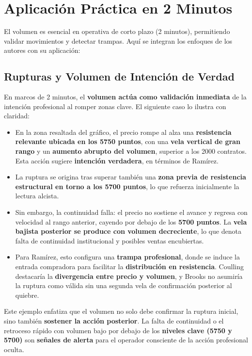 \section{Aplicaci\'on Pr\'actica en 2 Minutos}

El volumen es esencial en operativa de corto plazo (2 minutos), permitiendo validar movimientos y detectar trampas. Aqu\'i se integran los enfoques de los autores con su aplicaci\'on:
\subsection{Rupturas y Volumen de Intenci\'on de Verdad}

En marcos de 2 minutos, el \textbf{volumen act\'ua como validaci\'on inmediata} de la intenci\'on profesional al romper zonas clave. El siguiente caso lo ilustra con claridad:

\begin{itemize}
    \sloppy
    \item En la zona resaltada del gr\'afico, el precio rompe al alza una \textbf{resistencia relevante ubicada en los 5750 puntos}, con una \textbf{vela vertical de gran rango} y un \textbf{aumento abrupto del volumen}, superior a los 2000 contratos. Esta acci\'on sugiere \textbf{intenci\'on verdadera}, en t\'erminos de Ram\'irez.
    \item La ruptura se origina tras superar tambi\'en una \textbf{zona previa de resistencia estructural en torno a los 5700 puntos}, lo que refuerza inicialmente la lectura alcista.
    \item Sin embargo, la continuidad falla: el precio no sostiene el avance y regresa con velocidad al rango anterior, cayendo por debajo de los \textbf{5700 puntos}. La \textbf{vela bajista posterior se produce con volumen decreciente}, lo que denota falta de continuidad institucional y posibles ventas encubiertas.
    \item Para Ram\'irez, esto configura una \textbf{trampa profesional}, donde se induce la entrada compradora para facilitar la \textbf{distribuci\'on en resistencia}. Coulling destacar\'ia la \textbf{divergencia entre precio y volumen}, y Brooks no asumir\'ia la ruptura como v\'alida sin una segunda vela de confirmaci\'on posterior al quiebre.
\end{itemize}

\noindent
Este ejemplo enfatiza que el volumen no solo debe confirmar la ruptura inicial, sino tambi\'en \textbf{sostener la acci\'on posterior}. La falta de continuidad o el retroceso r\'apido con volumen bajo por debajo de los \textbf{niveles clave (5750 y 5700)} son \textbf{se\~nales de alerta} para el operador consciente de la acci\'on profesional oculta.

